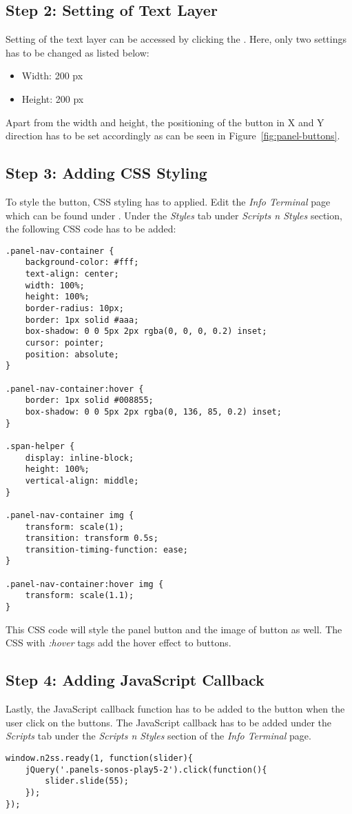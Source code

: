 \subsection*{Step 2: Setting of Text Layer}
Setting of the text layer can be accessed by clicking the . Here, only two settings has to be changed as listed below:
\begin{itemize}
\item Width: 200 px
\item Height: 200 px
\end{itemize}

Apart from the width and height, the positioning of the button in X and Y direction has to be set accordingly as can be seen in Figure~\ref{fig:panel-buttons}.

\subsection*{Step 3: Adding CSS Styling}
To style the button, CSS styling has to applied. Edit the \emph{Info Terminal} page which can be found under . Under the \emph{Styles} tab under \emph{Scripts n Styles} section, the following CSS code has to be added:
\begin{lstlisting}
.panel-nav-container {
	background-color: #fff;
	text-align: center;
	width: 100%;
	height: 100%;
	border-radius: 10px;
	border: 1px solid #aaa;
	box-shadow: 0 0 5px 2px rgba(0, 0, 0, 0.2) inset;
	cursor: pointer;
	position: absolute;
}

.panel-nav-container:hover {
	border: 1px solid #008855;
	box-shadow: 0 0 5px 2px rgba(0, 136, 85, 0.2) inset;
}

.span-helper {
	display: inline-block;
	height: 100%;
	vertical-align: middle;
}

.panel-nav-container img {
	transform: scale(1);
	transition: transform 0.5s;
	transition-timing-function: ease;
}

.panel-nav-container:hover img {
	transform: scale(1.1);
}
\end{lstlisting}

This CSS code will style the panel button and the image of button as well. The CSS with \emph{:hover} tags add the hover effect to buttons.

\subsection*{Step 4: Adding JavaScript Callback}
Lastly, the JavaScript callback function has to be added to the button when the user click on the buttons. The JavaScript callback has to be added under the \emph{Scripts} tab under the \emph{Scripts n Styles} section of the \emph{Info Terminal} page.
\begin{lstlisting}
window.n2ss.ready(1, function(slider){
	jQuery('.panels-sonos-play5-2').click(function(){
		slider.slide(55);
	});
});
\end{lstlisting}

